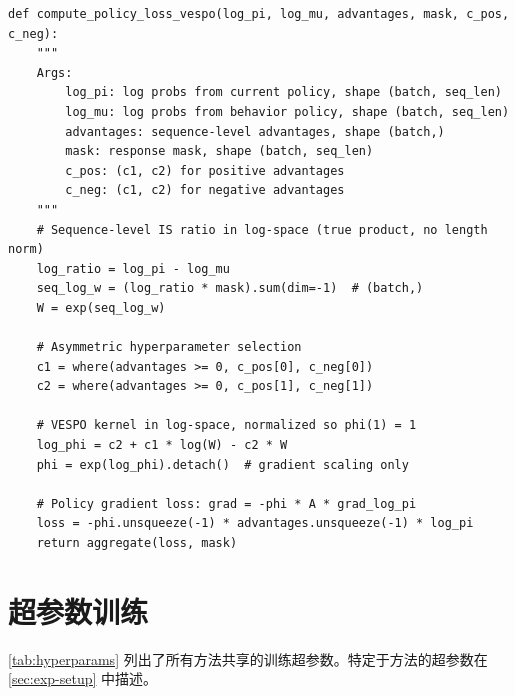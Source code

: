\documentclass{article}
\theoremstyle{plain}
\theoremstyle{definition}
\theoremstyle{remark}
\begin{document}
\begin{lstlisting}[style=pythonstyle, title={\textbf{VESPO Policy Loss}}]
def compute_policy_loss_vespo(log_pi, log_mu, advantages, mask, c_pos, c_neg):
    """
    Args:
        log_pi: log probs from current policy, shape (batch, seq_len)
        log_mu: log probs from behavior policy, shape (batch, seq_len)
        advantages: sequence-level advantages, shape (batch,)
        mask: response mask, shape (batch, seq_len)
        c_pos: (c1, c2) for positive advantages
        c_neg: (c1, c2) for negative advantages
    """
    # Sequence-level IS ratio in log-space (true product, no length norm)
    log_ratio = log_pi - log_mu
    seq_log_w = (log_ratio * mask).sum(dim=-1)  # (batch,)
    W = exp(seq_log_w)

    # Asymmetric hyperparameter selection
    c1 = where(advantages >= 0, c_pos[0], c_neg[0])
    c2 = where(advantages >= 0, c_pos[1], c_neg[1])

    # VESPO kernel in log-space, normalized so phi(1) = 1
    log_phi = c2 + c1 * log(W) - c2 * W
    phi = exp(log_phi).detach()  # gradient scaling only

    # Policy gradient loss: grad = -phi * A * grad_log_pi
    loss = -phi.unsqueeze(-1) * advantages.unsqueeze(-1) * log_pi
    return aggregate(loss, mask)
\end{lstlisting}

\section{超参数训练}
\label{app:hyperparameters}

\cref{tab:hyperparams} 列出了所有方法共享的训练超参数。特定于方法的超参数在 \cref{sec:exp-setup} 中描述。
\end{document}

